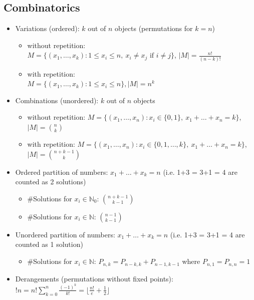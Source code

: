 \documentclass[10pt,a4paper,ngerman,oneside,]{article}
\begin{document}
\begin{multicols}{2}
\subsection{Combinatorics}
\begin{itemize}
\item Variations (ordered): $k$ out of $n$ objects {\footnotesize (permutations for $k = n$)}
\begin{itemize}
	\item without repetition:\\ $M = \{ (x_{1}, \ldots , x_{k}): 1 \leq x_i \leq n, \ x_i \neq x_j \mbox{ if } i \neq j \}$, $|M|= \frac{n!}{(n-k)!}$
	\item with repetition:\\ $M = \{ (x_{1}, \ldots , x_{k}): 1 \leq x_i \leq n \}, |M| = n^k$
	\end{itemize}
\item Combinations (unordered): $k$ out of $n$ objects
\begin{itemize}
	\item without repetition: $M = \{ (x_{1}, \ldots , x_{n}): x_i \in \{0,1\}, \ x_1 + \ldots + x_n = k \}$, $|M| = {n \choose k}$
	\item with repetition: $M = \{ (x_{1}, \ldots , x_{n}): x_i \in \{0,1,\ldots,k\}, \ x_1 + \ldots + x_n = k \}$, $|M| = {n+k-1 \choose k}$
\end{itemize}
\item Ordered partition of numbers: $x_1+\ldots+x_k = n$ {\footnotesize (i.e. 1+3 = 3+1 = 4 are counted as 2 solutions)}
\begin{itemize}
	\item \#Solutions for $x_i \in \mathbb{N}_0$: ${n+k-1 \choose k-1}$
	\item \#Solutions for $x_i \in \mathbb{N}$: ${n-1 \choose k-1}$
\end{itemize}
\item Unordered partition of numbers: $x_1+\ldots+x_k = n$ {\footnotesize (i.e. 1+3 = 3+1 = 4 are counted as 1 solution)}
\begin{itemize}
	\item \#Solutions for $x_i \in \mathbb{N}$: $P_{n,k} = P_{n-k,k}+P_{n-1,k-1}$ where $P_{n,1} = P_{n,n} = 1$
\end{itemize}
\item Derangements {\footnotesize (permutations without fixed points)}: $!n = n! \sum\nolimits_{k = 0}^n \frac{(-1)^k}{k!} = \lfloor \frac{n!}{e} + \frac{1}{2} \rfloor$
\end{itemize}

\end{multicols}
\end{document}

